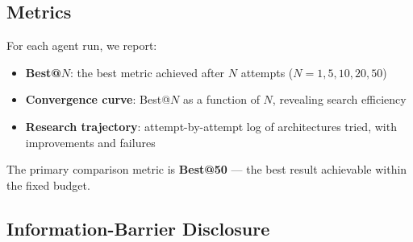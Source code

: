 \documentclass[universe,article,submit,pdftex,oneauthor]{Definitions/mdpi}
\begin{document}
\subsection{Metrics}
\label{sec:metrics_reporting}

For each agent run, we report:
\begin{itemize}
    \item \textbf{Best@$N$}: the best metric achieved after $N$ attempts ($N = 1, 5, 10, 20, 50$)
    \item \textbf{Convergence curve}: Best@$N$ as a function of $N$, revealing search efficiency
    \item \textbf{Research trajectory}: attempt-by-attempt log of architectures tried, with improvements and failures
\end{itemize}

The primary comparison metric is \textbf{Best@50} --- the best result achievable within the fixed budget.

\subsection{Information-Barrier Disclosure}
\end{document}
